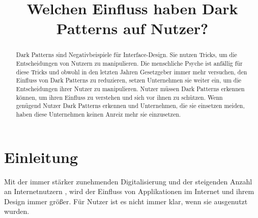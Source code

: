 \documentclass[conference,compsoc,final,a4paper]{IEEEtran}
\newcommand{\autoren}[0]{Karhan, Marvin}
\newcommand{\dokumententitel}[0]{Welchen Einfluss haben Dark Patterns auf Nutzer?}
\begin{document}
\title{\dokumententitel}

\author{
  \IEEEauthorblockN{\autoren}
}

\maketitle
\thispagestyle{plain}
\pagestyle{plain}


\begin{abstract}
  Dark Patterns sind Negativbeispiele für Interface-Design. Sie nutzen Tricks, um die Entscheidungen von Nutzern zu manipulieren. Die menschliche Psyche ist anfällig für diese Tricks und obwohl in den letzten Jahren Gesetzgeber immer mehr versuchen, den Einfluss von Dark Patterns zu reduzieren, setzen Unternehmen sie weiter ein, um die Entscheidungen ihrer Nutzer zu manipulieren. Nutzer müssen Dark Patterns erkennen können, um ihren Einfluss zu verstehen und sich vor ihnen zu schützen. Wenn genügend Nutzer Dark Patterns erkennen und Unternehmen, die sie einsetzen meiden, haben diese Unternehmen keinen Anreiz mehr sie einzusetzen.
\end{abstract}

{\small\tableofcontents}

\section{Einleitung}
Mit der immer stärker zunehmenden Digitalisierung und der steigenden Anzahl an Internetnutzern \autocite{ITU2020}, wird der Einfluss von Applikationen im Internet und ihrem Design immer größer. Für Nutzer ist es nicht immer klar, wenn sie ausgenutzt wurden.
\end{document}
